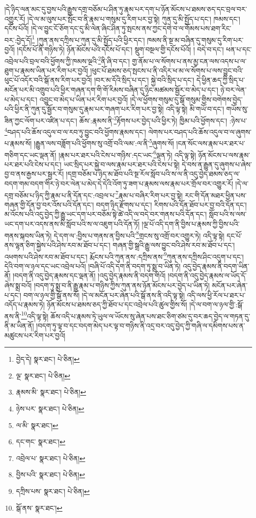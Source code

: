 །དེ་ཉིད་ལན་མང་དུ་བྱས་པའི་རྒྱུས་དགྲ་བཅོམ་པ་ཤིན་ཏུ་རྣམ་པར་དག་པ་ཉོན་མོངས་པ་ཐམས་ཅད་དང་བྲལ་བར་འགྱུར་རོ། །དེ་ལ་མ་ལུས་པར་སྤོང་བ་ནི་རྣམ་པ་གསུམ་དུ་རིག་པར་བྱ་སྟེ། ཀུན་དུ་མི་སྤྱོད་པ་དང་། ཁམས་དང་། དངོས་པོའོ། །དེ་ལ་བྱུང་ངོ་ཅོག་དང་དུ་མི་ལེན་ཞིང་ཤིན་ཏུ་སྤངས་ནས་ཀྱང་དགེ་བ་ལ་གོམས་པས་ཐག་རིང་བར་:བྱེད་དོ།\footnote{བྱེད་དེ།  སྣར་ཐང་།  པེ་ཅིན། } །ཀུན་ནས་དཀྲིས་པ་ཀུན་དུ་མི་སྤྱོད་པའི་ཕྱིར་དང་། ཁམས་ནི་སྔ་མ་བཞིན་དུ་གསུམ་དུ་རིག་པར་བྱའོ། །དངོས་པོ་ནི་གཉིས་ཏེ། ཉོན་མོངས་པའི་དངོས་པོ་དང་། སྡུག་བསྔལ་གྱི་དངོས་པོའོ། །
བདེ་བ་དང་། ཕན་པ་དང་འབྲེལ་པའི་བྲལ་བའི་ཕྱོགས་ཀྱི་ཁམས་ལྔའི་\footnote{ལྔ་  སྣར་ཐང་།  པེ་ཅིན། }ནི་ཞི་བ་དང་། གྱ་ནོམ་པ་ལ་སོགས་པ་ནས་མྱ་ངན་ལས་འདས་པ་ལ་ཐུག་པ་རྣམས་ཡིན་པར་རིག་པར་བྱའོ། །ཕུང་པོ་ཐམས་ཅད་སྤངས་པ་ནི་འདིར་ཕ་མ་ལ་སོགས་པ་ལས་བྱུང་བའི་ཕུང་པོ་འདོར་བའི་སྒོ་ནས་རིག་པར་བྱའོ། །བར་མ་དོའི་སྲིད་པ་དང་། སྐྱེ་བའི་སྲིད་པ་དང་། དེ་ཕྱིན་ཆད་ཀྱི་སྲིད་པ་མངོན་པར་མི་འགྲུབ་པའི་ཕྱིར་གཞན་དག་གི་གོ་རིམས་བཞིན་དུ་ཉིང་མཚམས་སྦྱོར་བ་མེད་པ་དང་། ཉེ་བར་ལེན་པ་མེད་པ་དང་། འབྱུང་བ་མེད་པ་ཡིན་པར་རིག་པར་བྱའོ། །དེ་ལ་ཕྱོགས་གསུམ་དུ་སྒོ་གསུམ་གྱིས་བགེགས་བྱེད་པའི་ཕྱིར་ནི་ཀུན་དུ་སྦྱོར་བ་གསུམ་དུ་རྣམ་པར་གཞག་པར་རིག་པར་བྱ་སྟེ། འདི་ལྟ་སྟེ། མི་གཡོ་བ་དང་། གཡོས་སུ་ཟིན་ཀྱང་ལོག་པར་འཛིན་པ་དང་། ཆོས་:རྣམས་ནི་\footnote{རྣམས་མི་  སྣར་ཐང་།  པེ་ཅིན། }རྟོགས་པར་བྱེད་པའི་ཕྱིར་ཏེ། ཁྱིམ་པའི་ཕྱོགས་དང་། :ཉེས་པ་\footnote{ཉེས་པར་  སྣར་ཐང་།  པེ་ཅིན། }བཤད་པའི་ཆོས་འདུལ་བ་ལ་རབ་ཏུ་བྱུང་བའི་ཕྱོགས་རྣམས་དང་། ལེགས་པར་བཤད་པའི་ཆོས་འདུལ་བ་ལ་ཞུགས་པ་རྣམས་སོ། །རྒྱུན་ལས་བཟློག་པའི་ཕྱོགས་སུ་འགྲོ་བའི་ལམ་:ལ་ནི་\footnote{ལ་མི་  སྣར་ཐང་། }ཞུགས་སོ། །ངན་སོང་ལས་རྣམ་པར་ཐར་པ་གཅིག་དང་ཡང་ལྡན་ནོ། །རྣམ་པར་ཐར་པའི་ངེས་པ་གཉིས་:དང་ཡང་\footnote{དང་གང་  སྣར་ཐང་། }ལྡན་ཏེ། འདི་ལྟ་སྟེ། ཉོན་མོངས་པ་ལས་རྣམ་པར་ཐར་པའི་ངེས་པ་དང་། ཡང་སྲིད་པར་སྐྱེ་བ་ལས་རྣམ་པར་ཐར་པའི་ངེས་པ་སྟེ། དེ་བས་ན་རྒྱུན་དུ་ཞུགས་པ་ཞེས་བྱ་བ་ནས་རྒྱས་པར་སྦྱར་རོ། །དགྲ་བཅོམ་པ་ཉིད་མ་ཐོབ་པའི་སྔ་རོལ་སློབ་པའི་ས་ལ་ནི་འདུ་བྱེད་ཐམས་ཅད་ལ་བདག་གམ་བདག་གིར་ཉེ་བར་ལེན་པ་མེད་དེ་དེའི་འོག་ཏུ་ཟག་པ་རྣམས་ལས་རྣམ་པར་གྲོལ་བར་འགྱུར་རོ། །དེ་ལ་དགྲ་བཅོམ་པ་ཉིད་ཀྱི་རྣམ་པ་ནི་དོན་དང་:འབྲལ་པ་\footnote{འབྲེལ་པ་  སྣར་ཐང་།  པེ་ཅིན། }རྣམ་པ་བཞིར་རིག་པར་བྱ་སྟེ། རང་གི་དོན་མཐར་ཕྱིན་པས་གཞན་གྱི་དོན་བྱ་བར་འོས་པའི་དོན་དང་། བདག་ཉིད་རྫོགས་པ་དང་། རིགས་པའི་དོན་ཐོབ་པར་བྱ་བའི་དོན་དང་། མ་འོངས་པའི་འདུ་བྱེད་ཀྱི་རྒྱུ་ཡང་དག་པར་བཅོམ་སྟེ་ཚེ་འདི་ལ་བདེ་བར་གནས་པའི་དོན་དང་། སློབ་པའི་ས་ལས་ཡང་དག་པར་འདས་ནས་མི་སློབ་པའི་ས་ལ་འཇུག་པའི་དོན་ཏོ། །ལྔ་པོ་འདི་དག་ནི་བྱིས་པ་རྣམས་ཀྱི་བྱིས་པའི་གནས་སྐབས་ཡིན་ཏེ། དེ་དག་ལ་:བྱིས་པ་གནས་ན་བྱིས་པའི་\footnote{བྱིས་པའི་  སྣར་ཐང་།  པེ་ཅིན། }གྲངས་སུ་འགྲོ་བར་འགྱུར་ཏེ། འདི་ལྟ་སྟེ། དང་པོ་ནས་ལྷན་ཅིག་སྐྱེས་པའི་ཤེས་རབ་མ་ཐོབ་པ་དང་། གཞན་གྱི་སྒྲའི་རྒྱུ་ལས་བྱུང་བའི་ཤེས་རབ་མ་ཐོབ་པ་དང་། འཕགས་པའི་ཤེས་རབ་མ་ཐོབ་པ་དང་། རྨོངས་པའི་ཀུན་ནས་:དཀྲིས་ནས་\footnote{དཀྲིས་པས་  སྣར་ཐང་།  པེ་ཅིན། }ཀུན་ནས་དཀྲིས་ཤིང་འདུག་པ་དང་། དེའི་བག་ལ་ཉལ་དང་ཡང་འབྲེལ་པའོ། །བཞི་པོ་འདི་དག་ནི་བདག་ཏུ་སྨྲ་བ་ཡིན་ཏེ། འདུ་བྱེད་རྣམས་ནི་བདག་ཡིན་ནོ། །བདག་ནི་འདུ་བྱེད་རྣམས་དང་ལྡན་ནོ། །འདུ་བྱེད་རྣམས་ནི་བདག་གིའོ། །བདག་ནི་འདུ་བྱེད་རྣམས་ལ་ཡོད་དོ་ཞེས་སྨྲ་བའོ། །བདག་ཏུ་སྨྲ་བ་ནི་རྒྱུ་རྣམ་པ་གཉིས་ཀྱིས་ཀུན་ནས་ཉོན་མོངས་པར་བྱེད་པ་ཡིན་ཏེ། མངོན་པར་ཞེན་པ་དང་། བག་ལ་ཉལ་གྱི་སྒོ་ནས་སོ། །དེ་ལ་མངོན་པར་ཞེན་པའི་སྒོ་ནས་ནི་འདི་ལྟ་སྟེ། འདི་ལས་ཕྱི་རོལ་པ་ཐར་པ་འདོད་པ་རྣམས་ཏེ། ཉོན་མོངས་པ་ཐམས་ཅད་ཀྱི་ཐོབ་པ་དང་འབྲེལ་པའི་ཚུལ་གྱིས་སོ། །དེ་ལ་བག་ལ་ཉལ་གྱི་:སྒོ་ནས་ནི་\footnote{སྒོ་ནས་  སྣར་ཐང་། }འདི་ལྟ་སྟེ། ཆོས་འདི་པ་རྣམས་ཏེ་ཡུལ་ལ་ཡོངས་སུ་ཞེན་པས་ཐང་ཅིག་ཙམ་དུ་བར་ཆད་བྱེད་ལ་གཏན་དུ་ནི་མ་ཡིན་ནོ། །བདག་ཏུ་ལྟ་བ་དང་བདག་མེད་པར་ལྟ་བ་གཉིས་ནི་འདྲ་བར་འདུ་བྱེད་ཀྱི་གཞི་ལ་དམིགས་པས་ན་མཚུངས་པར་རིག་པར་བྱའོ། 